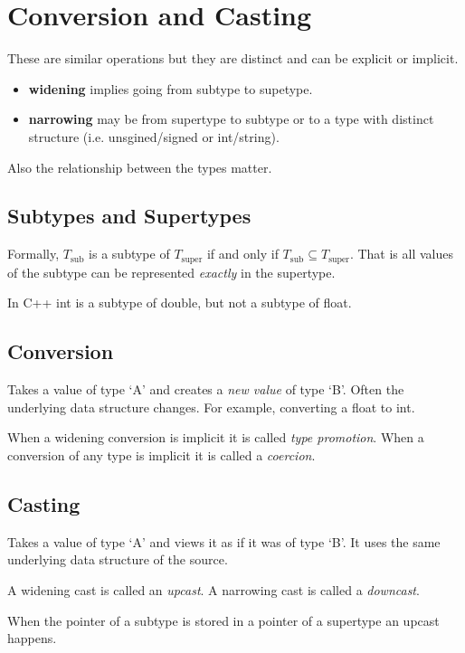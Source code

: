 \section{Conversion and Casting}
These are similar operations but they are distinct and can be explicit
or implicit.
\begin{itemize}
  \item \textbf{widening} implies going from subtype to supetype.
  \item \textbf{narrowing} may be from supertype to subtype or to a type
  with distinct structure (i.e. unsgined/signed or int/string).
\end{itemize}
Also the relationship between the types matter.

\subsection*{Subtypes and Supertypes}
Formally, $T_{\text{sub}}$ is a subtype of $T_{\text{super}}$ if and
only if $T_{\text{sub}}\subseteq T_{\text{super}}$. That is all values
of the subtype can be represented \textit{exactly} in the supertype.

In C++ int is a subtype of double, but not a subtype of float.

\subsection*{Conversion}
Takes a value of type `A' and creates a \textit{new value} of type `B'.
Often the underlying data structure changes. For example, converting a
float to int.

When a widening conversion is implicit it is called \textit{type
promotion}. When a conversion of any type is implicit it is called a
\textit{coercion}.

\subsection*{Casting}
Takes a value of type `A' and views it as if it was of type `B'. It uses
the same underlying data structure of the source.

A widening cast is called an \textit{upcast}. A narrowing cast is called
a \textit{downcast}.

When the pointer of a subtype is stored in a pointer of a supertype an
upcast happens.
